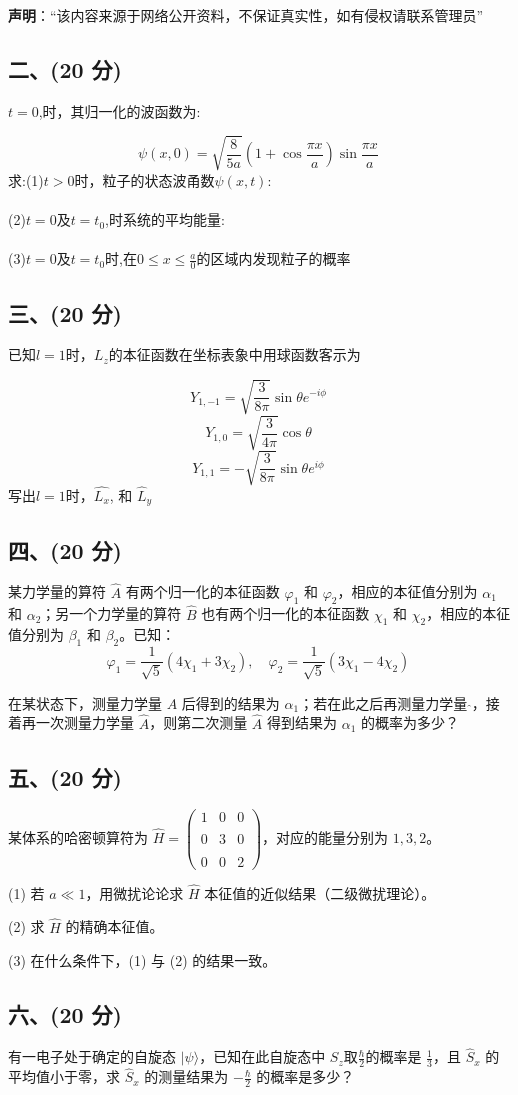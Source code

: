 
\textbf{声明}：“该内容来源于网络公开资料，不保证真实性，如有侵权请联系管理员”

\subsection{二、(20 分)}
 \( t = 0 \),时，其归一化的波函数为:

\[
\psi(x,0) = \sqrt{\frac{8}{5a}} (1 + \cos\frac{\pi x}{a}) \sin\frac{\pi x}{a}~
\]
求:(1)$t>0$时，粒子的状态波甬数$\psi(x,t)$:\\\\
(2)$t=0$及$t=t_0$,时系统的平均能量:\\\\
(3)$t=0$及$t=t_0$时,在$0\leq x\leq \frac{a}{0}$的区域内发现粒子的概率
\subsection{三、(20 分)}
已知$l=1$时，$L_z$的本征函数在坐标表象中用球函数客示为

\[Y_{1,-1} = \sqrt{\frac{3}{8\pi}} \sin \theta e^{-i\phi}~
\]
\[
Y_{1,0} = \sqrt{\frac{3}{4\pi}} \cos \theta~
\]
\[
Y_{1,1} = -\sqrt{\frac{3}{8\pi}} \sin \theta e^{i\phi}~
\]
写出$l=1$时，$\hat{L_x}$, 和 $\hat{L}_y $
\subsection{四、(20 分)}
某力学量的算符 $\hat{A}$ 有两个归一化的本征函数 $\varphi_1$ 和 $\varphi_2$，相应的本征值分别为 $\alpha_1$ 和 $\alpha_2$；另一个力学量的算符 $\hat{B}$ 也有两个归一化的本征函数 $\chi_1$ 和 $\chi_2$，相应的本征值分别为 $\beta_1$ 和 $\beta_2$。已知：
$$\varphi_1 = \frac{1}{\sqrt{5}} (4 \chi_1 + 3 \chi_2), \quad \varphi_2 = \frac{1}{\sqrt{5}} (3 \chi_1 - 4 \chi_2)~$$

在某状态下，测量力学量 $A$ 后得到的结果为 $\alpha_1$；若在此之后再测量力学量 $\hat{}$，接着再一次测量力学量 $\hat{A}$，则第二次测量 $\hat{A}$ 得到结果为 $\alpha_1$ 的概率为多少？
\subsection{五、(20 分)}
某体系的哈密顿算符为 $\hat{H} = \begin{pmatrix} 1 & 0 & 0 \\\\ 0 & 3 & 0 \\\\ 0 & 0 & 2 \end{pmatrix}$，对应的能量分别为 $1, 3, 2$。

(1) 若 $a \ll 1$，用微扰论论求 $\hat{H}$ 本征值的近似结果（二级微扰理论）。

(2) 求 $\hat{H}$ 的精确本征值。

(3) 在什么条件下，(1) 与 (2) 的结果一致。
\subsection{六、(20 分)}
有一电子处于确定的自旋态 $|\psi \rangle$，已知在此自旋态中 $S_z$取$\frac{\hbar}{2}$的概率是 $\frac{1}{3}$，且 $\hat{S}_x$ 的平均值小于零，求 $\hat{S}_x$ 的测量结果为 $-\frac{\hbar}{2}$ 的概率是多少？



